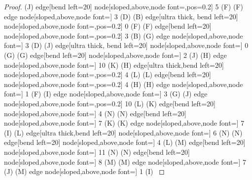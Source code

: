 \begin{proof}
{(J) edge[bend left=20]  node[sloped,above,node font=\tiny,pos=0.2] {5} (F)
(F) edge node[sloped,above,node font=\tiny] {3} (D)
(B) edge[ultra thick, bend left=20]  node[sloped,above,node font=\tiny,pos=0.2] {0} (F)
(F) edge[bend left=20]  node[sloped,above,node font=\tiny,pos=0.2] {3} (B)
(G) edge node[sloped,above,node font=\tiny] {3} (D)
(J) edge[ultra thick, bend left=20]  node[sloped,above,node font=\tiny] {0} (G)
(G) edge[bend left=20]  node[sloped,above,node font=\tiny] {2} (J)
(H) edge node[sloped,above,node font=\tiny] {10} (K)
(H) edge[ultra thick,bend left=20]
 node[sloped,above,node font=\tiny,pos=0.2] {4} (L)
(L) edge[bend left=20]  node[sloped,above,node font=\tiny,pos=0.2] {4} (H)
(H) edge node[sloped,above,node font=\tiny] {1} (F)
(I) edge node[sloped,above,node font=\tiny] {3} (G)
(J) edge node[sloped,above,node font=\tiny,pos=0.2] {10} (L)
(K) edge[bend left=20]
 node[sloped,above,node font=\tiny] {4} (N)
(N) edge[bend left=20]  node[sloped,above,node font=\tiny] {7} (K)
(K) edge node[sloped,above,node font=\tiny] {7} (I)
(L) edge[ultra thick,bend left=20]
 node[sloped,above,node font=\tiny] {6} (N)
(N) edge[bend left=20]  node[sloped,above,node font=\tiny] {4} (L)
(M) edge[bend left=20]
 node[sloped,above,node font=\tiny] {11} (N)
(N) edge[bend left=20]  node[sloped,above,node font=\tiny] {8} (M)
(M) edge node[sloped,above,node font=\tiny] {7} (J)
(M) edge node[sloped,above,node font=\tiny] {1} (I)
}
\usetikzlibrary{graphs,automata,positioning}
\end{proof}
